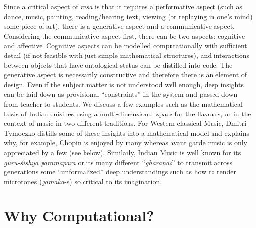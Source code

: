 Since a critical aspect of \textsl{rasa} is that it requires a performative aspect (such as dance, music, painting, reading/hearing text, viewing (or replaying in one’s mind) some piece of art), there is a generative aspect and a communicative aspect. Considering the communicative aspect first, there can be two aspects: cognitive and affective. Cognitive aspects can be modelled computationally with sufficient detail (if not feasible with just simple mathematical structures), and interactions between objects that have ontological status can be distilled into code. The generative aspect is necessarily constructive and therefore there is an element of design. Even if the subject matter is not understood well enough, deep insights can be laid down as provisional “constraints” in the system and passed down from teacher to students. We discuss a few examples such as the mathematical basis of Indian cuisines using a multi-dimensional space for the flavours, or in the context of music in two different traditions. For Western classical Music, Dmitri Tymoczko distills some of these insights into a mathematical model and explains why, for example, Chopin is enjoyed by many whereas avant garde music is only appreciated by a few (see below). Similarly, Indian Music is well known for its \textsl{guru-śishya paramapara} or its many different “\textsl{gharānas}” to transmit across generations some “unformalized” deep understandings such as how to render microtones (\textsl{gamaka}-s) so critical to its imagination.

\section*{Why Computational?}

